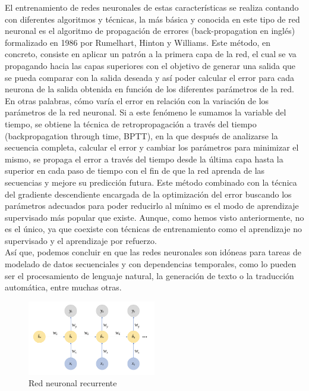 El entrenamiento de redes neuronales de estas características se realiza contando con diferentes algoritmos y técnicas, la más básica y conocida en este tipo de red neuronal es el algoritmo de propagación de errores (back-propagation en inglés) formalizado en 1986 por Rumelhart, Hinton y Williams. Este método, en concreto, consiste en aplicar un patrón a la primera capa de la red, el cual se va propagando hacia las capas superiores con el objetivo de generar una salida que se pueda comparar con la salida deseada y así poder calcular el error para cada neurona de la salida obtenida en función de los diferentes parámetros de la red. En otras palabras, cómo varía el error en relación con la variación de los parámetros de la red neuronal. Si a este fenómeno le sumamos la variable del tiempo, se obtiene la técnica de retropropagación a través del tiempo (backpropagation through time, BPTT), en la que después de analizarse la secuencia completa, calcular el error y cambiar los parámetros para minimizar el mismo, se propaga el error a través del tiempo desde la última capa hasta la superior en cada paso de tiempo con el fin de que la red aprenda de las secuencias y mejore su predicción futura. 
Este método combinado con la técnica del gradiente descendiente encargada de la optimización del error buscando los parámetros adecuados para poder reducirlo al mínimo es el modo de aprendizaje supervisado más popular que existe.  Aunque, como hemos visto anteriormente, no es el único, ya que coexiste con técnicas de entrenamiento como el aprendizaje no supervisado y el aprendizaje por refuerzo. \\

Así que, podemos concluir en que las redes neuronales son idóneas para tareas de modelado de datos secuenciales y con dependencias temporales, como lo pueden ser el procesamiento de lenguaje natural, la generación de texto o la traducción automática, entre muchas otras.
\begin{figure}[h]
	\centering
	\includegraphics[width = 0.5\textwidth]{Imagenes/Vectorial/recurrente.png}
	\caption{Red neuronal recurrente}
	\label{fig:rnn}
\end{figure}


